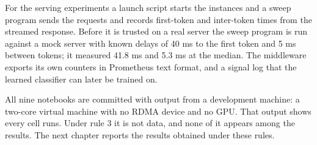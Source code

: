 For the serving experiments a launch script starts the instances and a sweep
program sends the requests and records first-token and inter-token times from
the streamed response. Before it is trusted on a real server the sweep program
is run against a mock server with known delays of 40 ms to the first token and
5 ms between tokens; it measured 41.8 ms and 5.3 ms at the median. The
middleware exports its own counters in Prometheus text format, and a signal
log that the learned classifier can later be trained on.

All nine notebooks are committed with output from a development machine: a
two-core virtual machine with no RDMA device and no GPU. That output shows
every cell runs. Under rule 3 it is not data, and none of it appears among
the results.
The next chapter reports the results obtained under these rules.
